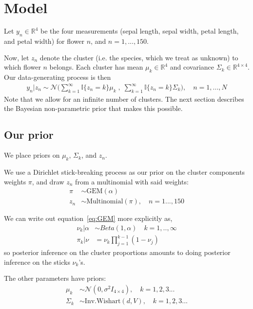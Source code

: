 \documentclass[a4paper]{article}
\begin{document}
\section{Model}
Let $y_{n}\in \mathbb{R}^4$ be the four measurements
(sepal length, sepal width, petal length, and petal width)
for flower $n$, and $n = 1, ..., 150$.

Now, let $z_n$ denote the cluster (i.e. the species, which we treat as unknown)
to which flower $n$ belongs.
Each cluster has mean $\mu_k\in \mathbb{R}^4$  and covariance $\Sigma_k \in \mathbb{R}^{4\times 4}$.
Our data-generating process is then
\begin{align}
	y_n | z_n \sim \mathcal{N}\Big(\sum_{k=1}^\infty \mathbb{I}\{z_n = k\} \mu_k \;,
              \; \sum_{k=1}^\infty \mathbb{I}\{z_n = k\} \Sigma_k\Big),
	\quad n = 1, ..., N
\end{align}
Note that we allow for an infinite number of clusters. The next section describes
the Bayesian non-parametric prior that makes this possible.

\subsection{Our prior}
We place priors on $\mu_k$, $\Sigma_k$, and $z_n$. \par

We use a Dirichlet stick-breaking process \cite{dp_prior} as our prior on the cluster components
weights $\pi$, and draw $z_n$ from a multinomial with said weights:
\begin{align}
	\pi &\sim \text{GEM}(\alpha) \label{eq:GEM} \\
	 z_n &\sim \text{Multinomial}(\pi), \quad n = 1..., 150
\end{align}

We can write out equation~\ref{eq:GEM} more explicitly as,
\begin{align}
  \nu_k | \alpha &\sim Beta(1, \alpha) \quad k = 1, .., \infty \label{eq:beta_sticks}\\
  \pi_k | \nu &= \nu_k \prod_{j=1}^{k-1} (1 - \nu_j) \label{eq:stick_breaking}
\end{align}
so posterior inference on the cluster proportions amounts to doing
posterior inference on the sticks $\nu_k$'s.

The other parameters have priors:
\begin{align}
	\mu_k &\sim \mathcal{N}(0, \sigma^2 I_{4\times 4}), \quad k = 1, 2, 3 ... \\
	\Sigma_k &\sim \text{Inv.Wishart}(d, V), \quad k = 1, 2, 3 ...
\end{align}
\end{document}
